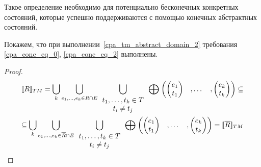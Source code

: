 Такое определение необходимо для потенциально бесконечных конкретных состояний, которые успешно поддерживаются с помощью конечных абстрактных состояний.

Покажем, что при выполнении~\ref{cpa_tm_abstract_domain_2} требования \ref{cpa_conc_eq_0}, \ref{cpa_conc_eq_2} выполнены.

\begin{proof}

\begin{align}
[\![ R ]\!]_{TM} = \bigcup_{k}{\bigcup_{
e_1,\dots,e_k \in R \cap E}{ 
\bigcup_{
\begin{array}{c}
t_1,\dots,t_k \in T \\
t_i \neq t_j
\end{array}
} {
\mathrel{\bigoplus}
\begin{pmatrix}
\begin{pmatrix}
e_1 \\
t_1 
\end{pmatrix}&,
\dots& ,
\begin{pmatrix}
e_k \\
t_k 
\end{pmatrix}
\end{pmatrix} 
}
}
} \subseteq \nonumber \\
\subseteq \bigcup_{k}{\bigcup_{
e_1,\dots,e_k \in \overline{R} \cap E}{
\bigcup_{
\begin{array}{c}
t_1,\dots,t_k \in T \\
t_i \neq t_j
\end{array}
} {
\mathrel{\bigoplus}
\begin{pmatrix}
\begin{pmatrix}
e_1 \\
t_1 
\end{pmatrix}&,
\dots& ,
\begin{pmatrix}
e_k \\
t_k 
\end{pmatrix}
\end{pmatrix} 
}
}
} = [\![ \overline{R} ]\!]_{TM} \nonumber
\end{align}


\end{proof}

